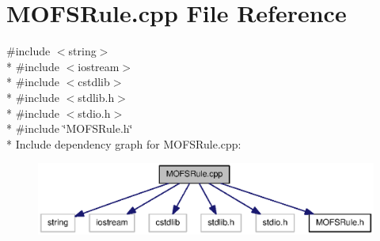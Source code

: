 \section{M\-O\-F\-S\-Rule.\-cpp File Reference}
\label{MOFSRule_8cpp}
{\ttfamily \#include $<$string$>$}\\*
{\ttfamily \#include $<$iostream$>$}\\*
{\ttfamily \#include $<$cstdlib$>$}\\*
{\ttfamily \#include $<$stdlib.\-h$>$}\\*
{\ttfamily \#include $<$stdio.\-h$>$}\\*
{\ttfamily \#include \char`\"{}M\-O\-F\-S\-Rule.\-h\char`\"{}}\\*
Include dependency graph for M\-O\-F\-S\-Rule.\-cpp\-:\nopagebreak
\begin{figure}[H]
\begin{center}
\leavevmode
\includegraphics[width=350pt]{MOFSRule_8cpp__incl}
\end{center}
\end{figure}
